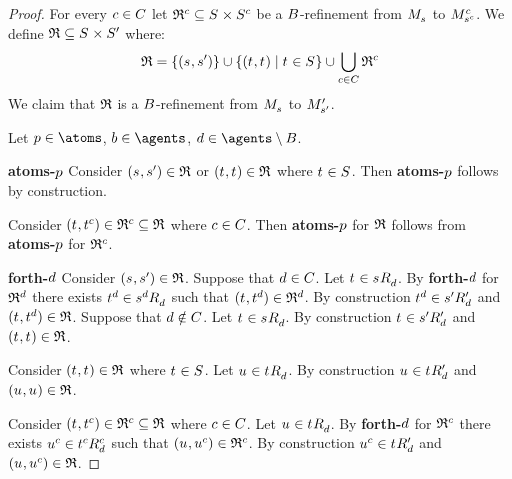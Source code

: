 \begin{proof}
For every $\agentC \in \agentsC$ let $\refinement^\agentC \subseteq \kStates \times \kStates[\agentC]$ be a $\agentsB$-refinement from $\kPModel{\kStateS}$ to $\kPModel[\agentC]{\kStateS[\agentC]}$.
We define $\refinement \subseteq \kStates \times \kStatesP$ where:
$$
\refinement = \{(\kStateS, \kStateSP)\} \cup \{(\kStateT, \kStateT) \mid \kStateT \in \kStates\} \cup \bigcup_{\agentC \in \agentsC} \refinement^\agentC
$$
We claim that $\refinement$ is a $\agentsB$-refinement from $\kPModel{\kStateS}$ to $\kPModelP{\kStateSP}$.

Let $\atomP \in \atoms$, $\agentB \in \agents$, $\agentD \in \agents \setminus \agentsB$.

{\bf atoms-$\atomP$}
Consider $(\kStateS, \kStateSP) \in \refinement$ or $(\kStateT, \kStateT) \in \refinement$ where $\kStateT \in \kStates$.
Then {\bf atoms-$\atomP$} follows by construction.

Consider $(\kStateT, \kStateT[\agentC]) \in \refinement^\agentC \subseteq \refinement$ where $\agentC \in \agentsC$.
Then {\bf atoms-$\atomP$} for $\refinement$ follows from {\bf atoms-$\atomP$} for $\refinement^\agentC$.

{\bf forth-$\agentD$}
Consider $(\kStateS, \kStateSP) \in \refinement$.
Suppose that $\agentD \in \agentsC$.
Let $\kStateT \in \kSuccessorsD{\kStateS}$.
By {\bf forth-$\agentD$} for $\refinement^\agentD$ there exists $\kStateT[\agentD] \in \kSuccessorsD{\kStateS[\agentD]}$ such that $(\kStateT, \kStateT[\agentD]) \in \refinement^\agentD$.
By construction $\kStateT[\agentD] \in \kSuccessorsPD{\kStateSP}$ and $(\kStateT, \kStateT[\agentD]) \in \refinement$.
Suppose that $\agentD \notin \agentsC$.
Let $\kStateT \in \kSuccessorsD{\kStateS}$.
By construction $\kStateT \in \kSuccessorsPD{\kStateSP}$ and $(\kStateT, \kStateT) \in \refinement$.

Consider $(\kStateT, \kStateT) \in \refinement$ where $\kStateT \in \kStates$.
Let $\kStateU \in \kSuccessorsD{\kStateT}$.
By construction $\kStateU \in \kSuccessorsPD{\kStateT}$ and $(\kStateU, \kStateU) \in \refinement$.

Consider $(\kStateT, \kStateT[\agentC]) \in \refinement^\agentC \subseteq \refinement$ where $\agentC \in \agentsC$.
Let $\kStateU \in \kSuccessorsD{\kStateT}$.
By {\bf forth-$\agentD$} for $\refinement^\agentC$ there exists $\kStateU[\agentC] \in \kSuccessorsD[\agentC]{\kStateT[\agentC]}$ such that $(\kStateU, \kStateU[\agentC]) \in \refinement^\agentC$.
By construction $\kStateU[\agentC] \in \kSuccessorsPD{\kStateT}$ and $(\kStateU, \kStateU[\agentC]) \in \refinement$.


\end{proof}
